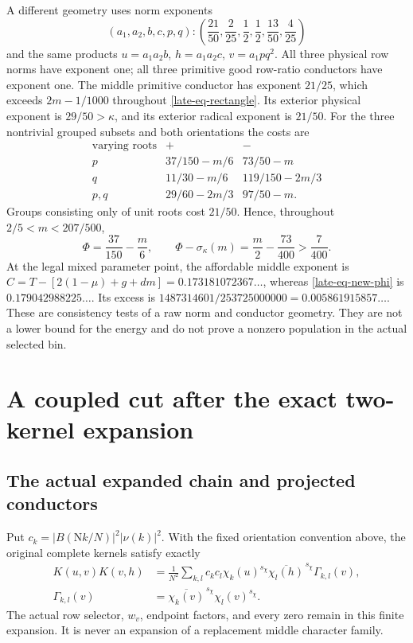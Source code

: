 \documentclass[11pt]{article}
\theoremstyle{definition}
\newcommand{\N}{\mathrm N}
\begin{document}
A different geometry uses norm exponents
\begin{equation}
 (a_1,a_2,b,c,p,q):
 \left(\frac{21}{50},\frac2{25},\frac12,\frac12,
                                      \frac{13}{50},\frac4{25}\right)
 \label{late-eq-new-raw}
\end{equation}
and the same products $u=a_1a_2b$, $h=a_1a_2c$, $v=a_1pq^2$.
All three physical row norms have exponent one; all three primitive
good row-ratio conductors have exponent one.  The middle primitive
conductor has exponent $21/25$, which exceeds $2m-1/1000$ throughout
\eqref{late-eq-rectangle}.  Its exterior physical exponent is
$29/50>\kappa$, and its exterior radical exponent is $21/50$.
For the three nontrivial grouped subsets and both orientations the
costs are
\[
 \begin{array}{c|cc}
   \text{varying roots}&+&-\\ \hline
   p&37/150-m/6&73/50-m\\
   q&11/30-m/6&119/150-2m/3\\
   p,q&29/60-2m/3&97/50-m.
 \end{array}
\]
Groups consisting only of unit roots cost $21/50$.  Hence, throughout
$2/5<m<207/500$,
\begin{equation}
 \Phi=\frac{37}{150}-\frac m6,\qquad
 \Phi-\sigma_\kappa(m)=\frac m2-\frac{73}{400}
                                          >\frac7{400}.
 \label{late-eq-new-phi}
\end{equation}
At the legal mixed parameter point, the affordable middle exponent
is $C=T-[2(1-\mu)+g+dm]=0.173181072367\ldots$, whereas
\eqref{late-eq-new-phi} is $0.179042988225\ldots$.  Its excess is
$1487314601/253725000000=0.005861915857\ldots$.
These are consistency tests of a raw norm and conductor geometry.
They are not a lower bound for the energy and do not prove a nonzero
population in the actual selected bin.

\section{A coupled cut after the exact two-kernel expansion}
\label{late-sec-components}

\subsection{The actual expanded chain and projected conductors}
\label{late-subsec-expansion}

Put $c_k=|B(\N k/N)|^2|\nu(k)|^2$.  With the fixed orientation
convention above, the original complete kernels satisfy exactly
\begin{align}
 K(u,v)K(v,h)
 &=\frac1{N^2}\sum_{k,l}c_kc_l
       \chi_k(u)^{s_\chi}\overline{\chi_l(h)}^{\,s_\chi}
       \Gamma_{k,l}(v),
 \label{late-eq-two-kernels}\\
 \Gamma_{k,l}(v)
 &=\overline{\chi_k(v)}^{\,s_\chi}\chi_l(v)^{s_\chi}.
 \label{late-eq-gamma-kl}
\end{align}
The actual row selector, $w_v$, endpoint factors, and every zero remain
in this finite expansion.  It is never an expansion of a replacement
middle character family.
\end{document}
